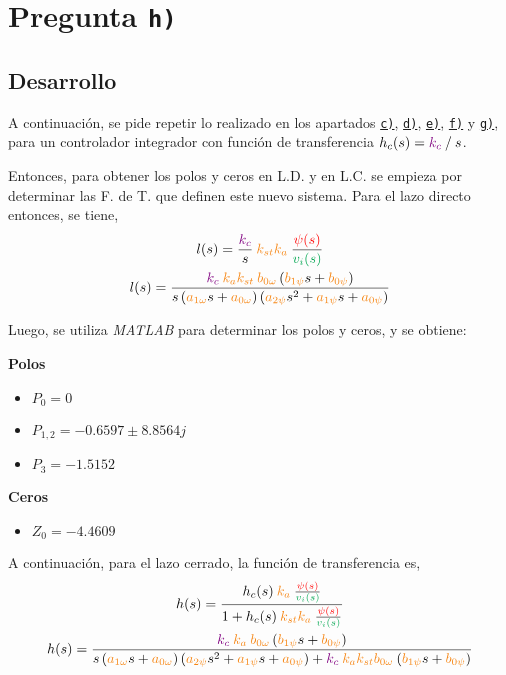 \section{Pregunta \texttt{h)}}\label{pregunta-h}
\subsection{Desarrollo}

A continuación, se pide repetir lo realizado en los apartados \hyperref[pregunta-c]{\texttt{c)}},
\hyperref[pregunta-d]{\texttt{d)}}, \hyperref[pregunta-e]{\texttt{e)}},
\hyperref[pregunta-f]{\texttt{f)}} y \hyperref[pregunta-g]{\texttt{g)}}, para un
controlador integrador con función de transferencia $h_{c}(s) = \mathbin{\color{violet}k_{c}} \mathbin{/} s$.

Entonces, para obtener los polos y ceros en L.D. y en L.C. se empieza por determinar
las F. de T. que definen este nuevo sistema. Para el lazo directo entonces, se
tiene,
\begin{gather}
    l(s) = \frac{\mora{k_{c}}}{s} \nara{k_{st}k_{a}} \frac{\rojo{\psi(s)}}{\verd{v_{i}(s)}} \\
    l(s) = \frac{\mora{k_c} \nara{k_{a}k_{st}} \nara{b_{0\omega}}\left(\nara{b_{1\psi}}s
            + \nara{b_{0\psi}}\right)}
        {s \left(\nara{a_{1\omega}}s + \nara{a_{0\omega}}\right)\left(\nara{a_{2\psi}}s^{2}
            + \nara{a_{1\psi}}s + \nara{a_{0\psi}} \right)} 
\end{gather}

Luego, se utiliza \textit{MATLAB} para determinar los polos y ceros, y se obtiene:

\begin{multicols}{2}
    \textbf{Polos}
    \begin{itemize}
        \item \(P_0 = 0 \)
        \item \(P_{1,2} = -0.6597 \pm 8.8564j\) 
        \item \(P_3 = -1.5152 \)
    \end{itemize}

    \columnbreak

    \textbf{Ceros}
    \begin{itemize}
        \item \(Z_0 = -4.4609\)
    \end{itemize}
\end{multicols}

A continuación, para el lazo cerrado, la función de transferencia es,
\begin{gather}
    h(s) = \frac{h_{c}(s)\nara{k_{a}}\frac{\rojo{\psi(s)}}{\verd{v_{i}(s)}}}
        {1 + h_{c}(s)\nara{k_{st}k_{a}}\frac{\rojo{\psi(s)}}{\verd{v_{i}(s)}}} \\
    h(s) = \frac{\mora{k_c}\nara{k_a}\nara{b_{0\omega}}\left(\nara{b_{1\psi}}s
            + \nara{b_{0\psi}}\right)}
        {s\left(\nara{a_{1\omega}}s + \nara{a_{0\omega}}\right)\left(\nara{a_{2\psi}}s^{2}
            + \nara{a_{1\psi}}s + \nara{a_{0\psi}}\right) + \mora{k_c}\nara{k_{a}k_{st}b_{0\omega}}
            \left(\nara{b_{1\psi}}s + \nara{b_{0\psi}}\right)}
\end{gather}

